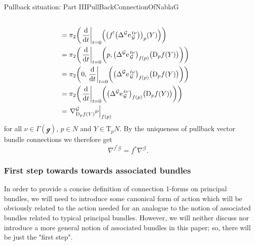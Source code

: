 \documentclass[reqno,a4paper,oneside]{amsart}
\newcommand{\e}{\ensuremath{\mathrm{e\;\!}}}
\theoremstyle{plain}
\theoremstyle{remark}
\theoremstyle{definition}
\begin{document}
\begin{remarks}{Pullback situation: Part III}{PullBackConnectionOfNablaG}
\begin{align*}
\\
&=
\pi_2 \mleft(
\mleft.\frac{\mathrm{d}}{\mathrm{d}t}\mright|_{t=0} \Bigl( \mleft( f^!\mleft( \Delta^{\mathcal{G}} \e_{\mathcal{G}}^{t\nu} \mright) \mright)_p (Y) \Bigr)
\mright)
\\
&=
\pi_2 \mleft(
\mleft.\frac{\mathrm{d}}{\mathrm{d}t}\mright|_{t=0} \biggl( p, 
\mleft( \Delta^{\mathcal{G}} \e_{\mathcal{G}}^{t\nu} \mright)_{f(p)} \bigl( \mathrm{D}_pf(Y) \bigr) 
\biggr)
\mright)
\\
&=
\pi_2 \mleft( 0,
\mleft.\frac{\mathrm{d}}{\mathrm{d}t}\mright|_{t=0} \biggl( 
\mleft( \Delta^{\mathcal{G}} \e_{\mathcal{G}}^{t\nu} \mright)_{f(p)} \bigl( \mathrm{D}_pf(Y) \bigr) 
\biggr)
\mright)
\\
&=
\pi_2 \mleft(
\mleft.\frac{\mathrm{d}}{\mathrm{d}t}\mright|_{t=0} \biggl( 
\mleft( \Delta^{\mathcal{G}} \e_{\mathcal{G}}^{t\nu} \mright)_{f(p)} \bigl( \mathrm{D}_pf(Y) \bigr) 
\biggr)
\mright)
\\
&=
\mleft.\nabla^{\mathcal{G}}_{\mathrm{D}_pf(Y)} \nu\mright|_{f(p)}
\end{align*}
for all $\nu \in \Gamma(\mathcal{g})$, $p \in N$ and $Y \in \mathrm{T}_p N$. By the uniqueness of pullback vector bundle connections we therefore get
\begin{equation*}
\nabla^{f^*\mathcal{G}}
=
f^*\nabla^{\mathcal{G}}.
\end{equation*}
\end{remarks}

\subsubsection{First step towards towards associated bundles}

In order to provide a concise definition of connection 1-forms on principal bundles, we will need to introduce some canonical form of action which will be obviously related to the action needed for an analogue to the notion of associated bundles related to typical principal bundles. However, we will neither discuss nor introduce a more general notion of associated bundles in this paper; so, there will be just the "first step". 
\end{document}
